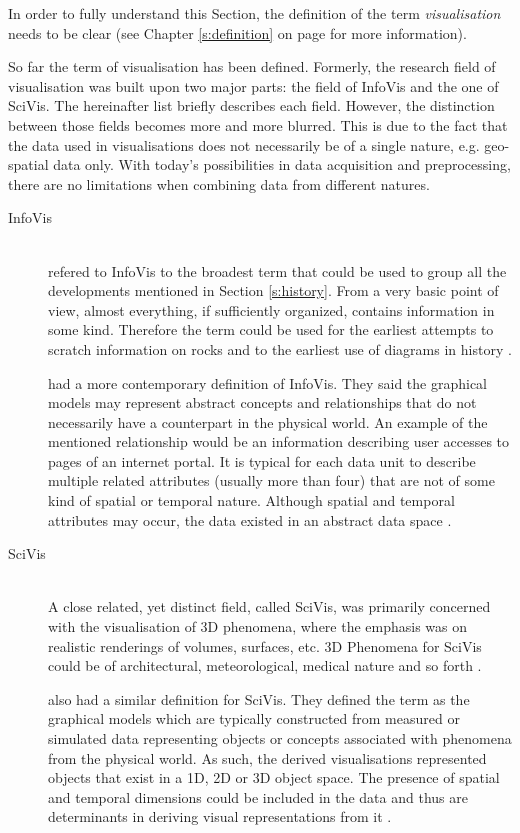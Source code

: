 \cbstart
In order to fully understand this Section, the definition of the term \textit{visualisation} needs to be clear (see Chapter \ref{s:definition} on page \pageref{s:definition} for more information).

So far the term of visualisation has been defined. Formerly, the research field of visualisation was built upon two major parts: the field of \ac{InfoVis} and the one of \ac{SciVis}. The hereinafter list briefly describes each field. However, the distinction between those fields becomes more and more blurred. This is due to the fact that the data used in visualisations does not necessarily be of a single nature, e.g. geo-spatial data only. With today's possibilities in data acquisition and preprocessing, there are no limitations when combining data from different natures.

\begin{description}

\item[\acl{InfoVis}] \hfill \\
\citeauthor{Friendly.2001} refered to \ac{InfoVis} to the broadest term that could be used to group all the developments mentioned in Section \ref{s:history}. From a very basic point of view, almost everything, if sufficiently organized, contains information in some kind. Therefore the term could be used for the earliest attempts to scratch information on rocks and to the earliest use of diagrams in history .

\citeauthor{Ferreira2003} had a more contemporary definition of \ac{InfoVis}. They said the graphical models may represent abstract concepts and relationships that do not necessarily have a counterpart in the physical world. An example of the mentioned relationship would be an information describing user accesses to pages of an internet portal. It is typical for each data unit to describe multiple related attributes (usually more than four) that are not of some kind of spatial or temporal nature. Although spatial and temporal attributes may occur, the data existed in an abstract data space .

\item[\acl{SciVis}] \hfill \\
A close related, yet distinct field, called \ac{SciVis}, was primarily concerned with the visualisation of 3D phenomena, where the emphasis was on realistic renderings of volumes, surfaces, etc. 3D Phenomena for \ac{SciVis} could be of architectural, meteorological, medical nature and so forth .

\citeauthor{Ferreira2003} also had a similar definition for \ac{SciVis}. They defined the term as the graphical models which are typically constructed from measured or simulated data representing objects or concepts associated with phenomena from the physical world. As such, the derived visualisations represented objects that exist in a 1D, 2D or 3D object space. The presence of spatial and temporal dimensions could be included in the data and thus are determinants in deriving visual representations from it .
\end{description}

